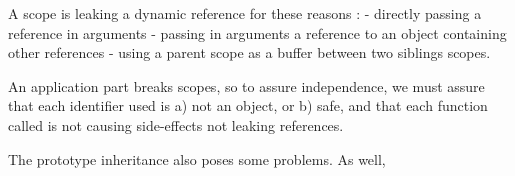 A scope is leaking a dynamic reference for these reasons :
- directly passing a reference in arguments
- passing in arguments a reference to an object containing other references
- using a parent scope as a buffer between two siblings scopes.

An application part breaks scopes, so to assure independence, we must assure that each identifier used is a) not an object, or b) safe, and that each function called is not causing side-effects not leaking references.

The prototype inheritance also poses some problems.
As well, 